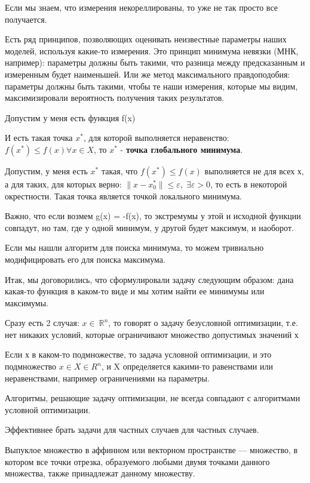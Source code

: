 \documentclass[a4paper, 12pt]{article}
\renewcommand{\epsilon}{\varepsilon}
\begin{document}
	Если мы знаем, что измерения некореллированы, то уже не так просто все получается.
	
	Есть ряд принципов, позволяющих оценивать неизвестные параметры наших моделей, используя какие-то измерения. Это принцип минимума невязки (МНК, например): параметры должны быть такими, что разница между предсказанным и измеренным будет наименьшей. Или же метод максимального правдоподобия: параметры должны быть такими, чтобы те наши измерения, которые мы видим, максимизировали вероятность получения таких результатов. 
	
	
	Допустим у меня есть функция f(x)
	
	И есть такая точка $x^*$, для которой выполняется неравенство: $f(x^*) \leq f(x) \forall x \in X$, то $x^*$ - \textbf{точка глобального минимума}.
	
	Допустим, у меня есть $x^*$ такая, что $f(x^*) \leq f(x)$ выполняется не для всех х, а для таких, для которых верно: $\|x-x_0^*\|\leq \epsilon , \; \exists \epsilon >0 $, то есть в некоторой окрестности. Такая точка является точкой локального минимума. 
	
	Важно, что если возмем g(x) = -f(x), то экстремумы у этой и исходной функции совпадут, но там, где у одной минимум, у другой будет максимум, и наоборот. 
	
	Если мы нашли алгоритм для поиска минимума, то можем тривиально модифицировать его для поиска максимума. 
	
	Итак, мы договорились, что сформулировали задачу следующим образом: дана какая-то функция в каком-то виде и мы хотим найти ее минимумы или максимумы. 
	
	Сразу есть 2 случая: $x \in\ \mathbb {R}^n$, то говорят о задачу безусловной оптимизации, т.е. нет никаких условий, которые ограничивают множество допустимых значений х
	
	Если х в каком-то подмножестве, то задача условной оптимизации, и это подмножество $x\in X \in R^n$, и X определяется какими-то равенствами или неравенствами, например ограничениями на параметры. 
	
	Алгоритмы, решающие задачу оптимизации, не всегда совпадают с алгоритмами условной оптимизации. 
	
	Эффективнее брать задачи для частных случаев для частных случаев. 
	
	Выпуклое множество в аффинном или векторном пространстве — множество, в котором все точки отрезка, образуемого любыми двумя точками данного множества, также принадлежат данному множеству.
	
\end{document}
